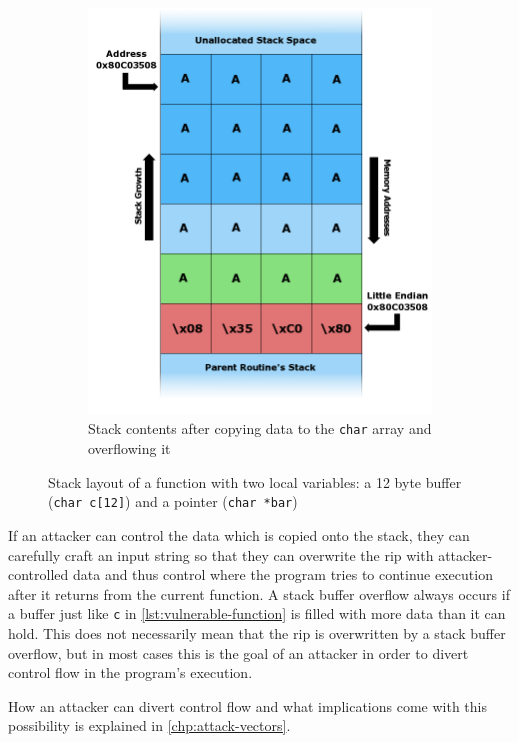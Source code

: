 \begin{figure}[htb]
\begin{subfigure}[t]{0.3\textwidth}
		\includegraphics[height=0.25\textheight]{figures/Stack_Overflow_4}
		\caption{Stack contents after copying data to the \texttt{char} array and overflowing it \cite{Lynn2007b}}
		\label{fig:stack-layout-overflow}
	\end{subfigure}
	\caption{Stack layout of a function with two local variables: a 12 byte buffer (\texttt{char c[12]}) and a pointer (\texttt{char *bar})}
	\label{fig:stack-layout}
\end{figure}

If an attacker can control the data which is copied onto the stack, they can carefully craft an input string so that they can overwrite the \gls{rip} with attacker-controlled data and thus control where the program tries to continue execution after it returns from the current function.
A stack buffer overflow always occurs if a buffer just like \texttt{c} in \cref{lst:vulnerable-function} is filled with more data than it can hold.
This does not necessarily mean that the \gls{rip} is overwritten by a stack buffer overflow, but in most cases this is the goal of an attacker in order to divert control flow in the program's execution.

How an attacker can divert control flow and what implications come with this possibility is explained in \cref{chp:attack-vectors}.


